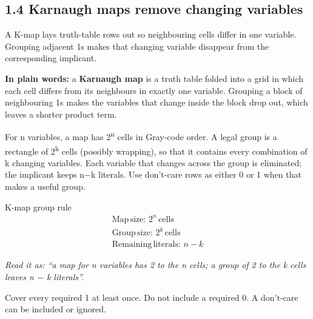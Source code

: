 \documentclass[11pt]{article}
\begin{document}
\begin{keepsection}
\section{1.4 Karnaugh maps remove changing variables}

A K-map lays truth-table rows out so neighbouring cells differ in one variable. Grouping adjacent 1s makes that changing variable disappear from the corresponding implicant.

\begin{plainbox}\textbf{In plain words:} a \textbf{Karnaugh map} is a truth table folded into a grid in which each cell differs from its neighbours in exactly one variable. Grouping a block of neighbouring 1s makes the variables that change inside the block drop out, which leaves a shorter product term.\end{plainbox}

For n variables, a map has 2\textsuperscript{n} cells in Gray-code order. A legal group is a rectangle of 2\textsuperscript{k} cells (possibly wrapping), so that it contains every combination of k changing variables. Each variable that changes across the group is eliminated; the implicant keeps n\ensuremath{-}k literals. Use don’t-care rows as either 0 or 1 when that makes a useful group.

\begin{equationcard}{K-map group rule}
\[ \begin{gathered} \text{Map}\, \text{size}:\, 2^{{n}}\, \text{cells} \\ \text{Group}\, \text{size}:\, 2^{{k}}\, \text{cells} \\ \text{Remaining}\, \text{literals}:\, {n}-{k} \end{gathered} \]
{\small \emph{Read it as: “a map for n variables has 2 to the n cells; a group of 2 to the k cells leaves n \ensuremath{-} k literals”.}\par Cover every required 1 at least once. Do not include a required 0. A don’t-care can be included or ignored.}
\end{equationcard}


\end{keepsection}
\end{document}
